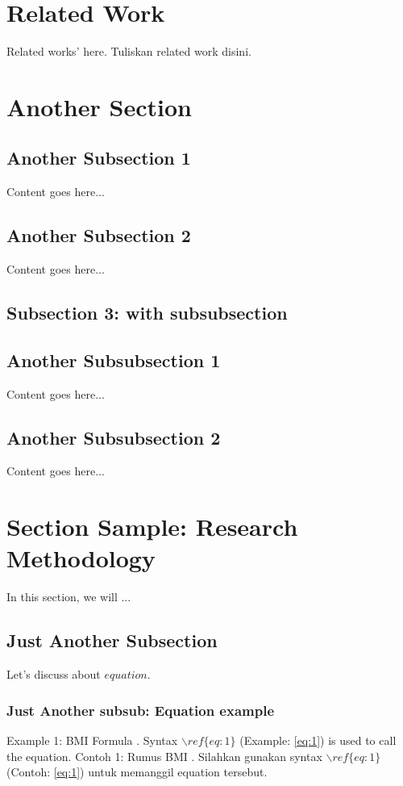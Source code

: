 \documentclass[journal]{IEEEtran}
\begin{document}
\section{Related Work}
Related works' here. Tuliskan related work disini.
    
\section{Another Section}

\subsection{Another Subsection 1}
Content goes here... 

\subsection{Another Subsection 2}
Content goes here... 

\subsection{Subsection 3: with subsubsection}

\subsection{Another Subsubsection 1}
Content goes here... 

\subsection{Another Subsubsection 2}
Content goes here... 

\section{Section Sample: Research Methodology}
In this section, we will ...

\subsection{Just Another Subsection} 
Let's discuss about $equation$.

\subsubsection{Just Another subsub: Equation example}
Example 1: BMI Formula \cite{nameofref1}. Syntax $\backslash ref\{eq:1\}$ (Example: \ref{eq:1}) is used to call the equation. Contoh 1: Rumus BMI \cite{nameofref1}. Silahkan gunakan syntax $\backslash ref\{eq:1\}$ (Contoh: \ref{eq:1}) untuk memanggil equation tersebut.
\end{document}
